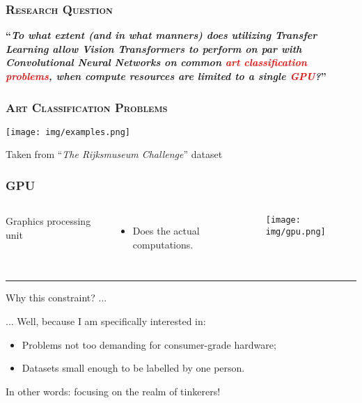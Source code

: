 \documentclass{beamer}
\newcommand{\createtitle}[1]{\frametitle{\textsc{\bfseries#1}}}
\begin{document}
\newcommand{\stilltoexplain}[1]{\textcolor{red}{#1}}
\begin{frame}
\createtitle{Research Question}
\begin{center}
\textbf{\large ``\textit{To what extent (and in what manners) does utilizing Transfer Learning allow Vision Transformers to perform on par with Convolutional Neural Networks \pause on common \stilltoexplain{art classification problems}, when compute resources are limited to a single \stilltoexplain{GPU}?}''}
\end{center}
\end{frame}

\begin{frame}
\createtitle{Art Classification Problems}
\texttt{[image: img/examples.png]}

\vspace{0.5cm}
\centering
Taken from ``\textit{The Rijksmuseum Challenge}'' dataset
\end{frame}

\begin{frame}
\createtitle{GPU}
\begin{columns}
Graphics processing unit
\begin{itemize}
\item Does the actual computations.
\end{itemize}
\texttt{[image: img/gpu.png]}
\end{columns}
\vspace{0.5cm}
\pause
\rule{\textwidth}{0.7pt}

\vspace{0.5cm}

Why this constraint? ...
\pause

\vspace{0.5cm}

... Well, because I am specifically interested in:
\begin{itemize}
\item Problems not too demanding for consumer-grade hardware;
\item Datasets small enough to be labelled by one person.
\end{itemize}
\pause
In other words: focusing on the realm of tinkerers!
\end{frame}
\end{document}
